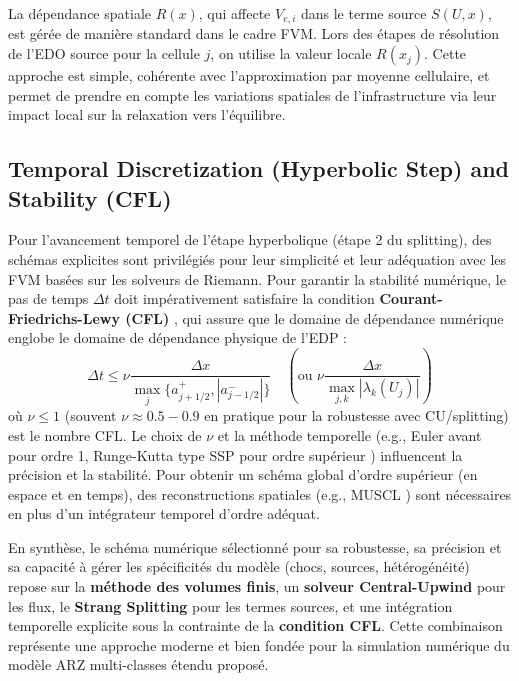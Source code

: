 La dépendance spatiale \( R(x) \), qui affecte \( V_{e,i} \) dans le terme source \( S(U, x) \), est gérée de manière standard dans le cadre FVM. Lors des étapes de résolution de l'EDO source pour la cellule \( j \), on utilise la valeur locale \( R(x_j) \). Cette approche est simple, cohérente avec l'approximation par moyenne cellulaire, et permet de prendre en compte les variations spatiales de l'infrastructure via leur impact local sur la relaxation vers l'équilibre.

\subsection{Temporal Discretization (Hyperbolic Step) and Stability (CFL)}
\label{subsec:time_stepping}

Pour l'avancement temporel de l'étape hyperbolique (étape 2 du splitting), des schémas explicites sont privilégiés pour leur simplicité et leur adéquation avec les FVM basées sur les solveurs de Riemann. Pour garantir la stabilité numérique, le pas de temps \( \Delta t \) doit impérativement satisfaire la condition \textbf{Courant-Friedrichs-Lewy (CFL)} \cite{CourantFriedrichsLewy1928}, qui assure que le domaine de dépendance numérique englobe le domaine de dépendance physique de l'EDP :
\begin{equation}
    \label{eq:cfl_condition_final}
    \Delta t \le \nu \frac{\Delta x}{\max_{j} \{ a_{j+1/2}^+, |a_{j-1/2}^-| \}} \quad (\text{ou } \nu \frac{\Delta x}{\max_{j, k} |\lambda_k(U_j)|})
\end{equation}
où \( \nu \le 1 \) (souvent \( \nu \approx 0.5-0.9 \) en pratique pour la robustesse avec CU/splitting) est le nombre CFL. Le choix de \( \nu \) et la méthode temporelle (e.g., Euler avant pour ordre 1, Runge-Kutta type SSP pour ordre supérieur \cite{GottliebShuTadmor2001}) influencent la précision et la stabilité. Pour obtenir un schéma global d'ordre supérieur (en espace et en temps), des reconstructions spatiales (e.g., MUSCL \cite{vanLeer1979}) sont nécessaires en plus d'un intégrateur temporel d'ordre adéquat.

En synthèse, le schéma numérique sélectionné pour sa robustesse, sa précision et sa capacité à gérer les spécificités du modèle (chocs, sources, hétérogénéité) repose sur la \textbf{méthode des volumes finis}, un \textbf{solveur Central-Upwind} pour les flux, le \textbf{Strang Splitting} pour les termes sources, et une intégration temporelle explicite sous la contrainte de la \textbf{condition CFL}. Cette combinaison représente une approche moderne et bien fondée pour la simulation numérique du modèle ARZ multi-classes étendu proposé.

